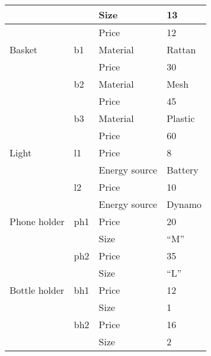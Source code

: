 \begin{longtable}[c]{|l|l|l|l|}
                       &                & Size           & 13              \\ \hline
                       &                & Price          & 12              \\ \hline
Basket                 & b1             & Material       & Rattan          \\ \hline
                       &                & Price          & 30              \\ \hline
                       & b2             & Material       & Mesh            \\ \hline
                       &                & Price          & 45              \\ \hline
                       & b3             & Material       & Plastic         \\ \hline
                       &                & Price          & 60              \\ \hline
Light                  & l1             & Price          & 8               \\ \hline
                       &                & Energy source  & Battery         \\ \hline
                       & l2             & Price          & 10              \\ \hline
                       &                & Energy source  & Dynamo          \\ \hline
Phone holder           & ph1            & Price          & 20              \\ \hline
                       &                & Size           & “M”             \\ \hline
                       & ph2            & Price          & 35              \\ \hline
                       &                & Size           & “L”             \\ \hline
Bottle holder          & bh1            & Price          & 12              \\ \hline
                       &                & Size           & 1               \\ \hline
                       & bh2            & Price          & 16              \\ \hline
                       &                & Size           & 2               \\ \hline
\end{longtable}

\newpage

